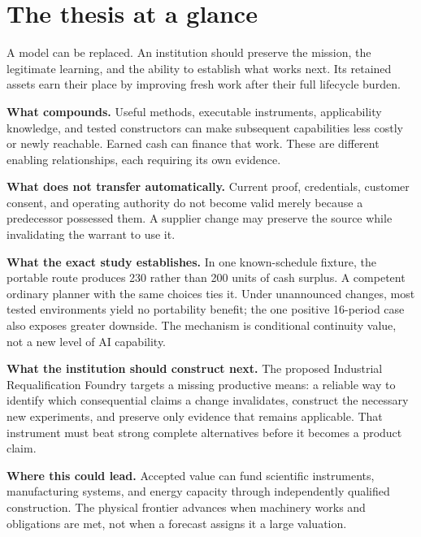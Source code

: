 \section*{The thesis at a glance}
\begin{insight}
A model can be replaced. An institution should preserve the mission, the legitimate learning, and the ability to establish what works next. Its retained assets earn their place by improving fresh work after their full lifecycle burden.
\end{insight}

\textbf{What compounds.} Useful methods, executable instruments, applicability knowledge, and tested constructors can make subsequent capabilities less costly or newly reachable. Earned cash can finance that work. These are different enabling relationships, each requiring its own evidence.

\textbf{What does not transfer automatically.} Current proof, credentials, customer consent, and operating authority do not become valid merely because a predecessor possessed them. A supplier change may preserve the source while invalidating the warrant to use it.

\textbf{What the exact study establishes.} In one known-schedule fixture, the portable route produces 230 rather than 200 units of cash surplus. A competent ordinary planner with the same choices ties it. Under unannounced changes, most tested environments yield no portability benefit; the one positive 16-period case also exposes greater downside. The mechanism is conditional continuity value, not a new level of AI capability.

\textbf{What the institution should construct next.} The proposed Industrial Requalification Foundry targets a missing productive means: a reliable way to identify which consequential claims a change invalidates, construct the necessary new experiments, and preserve only evidence that remains applicable. That instrument must beat strong complete alternatives before it becomes a product claim.

\textbf{Where this could lead.} Accepted value can fund scientific instruments, manufacturing systems, and energy capacity through independently qualified construction. The physical frontier advances when machinery works and obligations are met, not when a forecast assigns it a large valuation.

